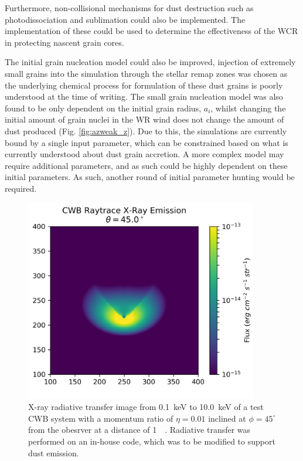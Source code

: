 Furthermore, non-collisional mechanisms for dust destruction such as photodissociation and sublimation could also be implemented.
The implementation of these could be used to determine the effectiveness of the WCR in protecting nascent grain cores.


The initial grain nucleation model could also be improved, injection of extremely small grains into the simulation through the stellar remap zones was chosen as the underlying chemical process for formulation of these dust grains is poorly understood at the time of writing.
The small grain nucleation model was also found to be only dependent on the initial grain radius, $a_i$, whilst changing the initial amount of grain nuclei in the WR wind does not change the amount of dust produced (Fig. \ref{fig:azweak_z}).
Due to this, the simulations are currently bound by a single input parameter, which can be constrained based on what is currently understood about dust grain accretion.
A more complex model may require additional parameters, and as such could be highly dependent on these initial parameters. As such, another round of initial parameter hunting would be required.


\begin{figure}[ht]
  \centering
  \includegraphics[width=4in]{assets/ray/cwb-raytrace-045.0.png}
  \caption{X-ray radiative transfer image from \SI{0.1}{\kilo\electronvolt} to \SI{10.0}{\kilo\electronvolt} of a test CWB system with a momentum ratio of $\eta = 0.01$ inclined at $\phi = 45^\circ$ from the obesrver at a distance of \SI{1}{\kilo\parsec}. Radiative transfer was performed on an in-house code, which was to be modified to support dust emission.}
  \label{fig:inhousert}
\end{figure}

